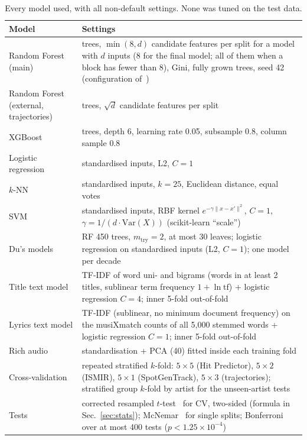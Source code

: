 \begin{table}[!htbp]
\centering
\caption{Every model used, with all non-default settings. None was tuned on the test data.}
\label{tab:settings}
\footnotesize
\setlength{\tabcolsep}{3pt}
\begin{tabular}{@{}>{\raggedright\arraybackslash}p{2.4cm}>{\raggedright\arraybackslash}p{5.6cm}@{}}
\toprule
Model & Settings \\
\midrule
Random Forest (main) & 80 trees, $\min(8,d)$ candidate features per split for a model with $d$ inputs (8 for the final model; all of them when a block has fewer than 8), Gini, fully grown trees, seed 42 (configuration of~\cite{middlebrook2019song}) \\
Random Forest (external, trajectories) & 200 trees, $\sqrt{d}$ candidate features per split \\
XGBoost & 400 trees, depth 6, learning rate 0.05, subsample 0.8, column sample 0.8 \\
Logistic regression & standardised inputs, L2, $C=1$ \\
$k$-NN & standardised inputs, $k=25$, Euclidean distance, equal votes \\
SVM & standardised inputs, RBF kernel $e^{-\gamma\|x-x'\|^2}$, $C=1$, $\gamma=1/(d\cdot\mathrm{Var}(X))$ (scikit-learn ``scale'') \\
Du's models~\cite{du2022spotify} & RF 450 trees, $m_{\text{try}}=2$, at most 30 leaves; logistic regression on standardised inputs (L2, $C=1$); one model per decade \\
Title text model & TF-IDF of word uni- and bigrams (words in at least 2 titles, sublinear term frequency $1+\ln\mathrm{tf}$) + logistic regression $C=4$; inner 5-fold out-of-fold \\
Lyrics text model & TF-IDF (sublinear, no minimum document frequency) on the musiXmatch counts of all 5{,}000 stemmed words + logistic regression $C=1$; inner 5-fold out-of-fold \\
Rich audio & standardisation + PCA (40) fitted inside each training fold \\
\midrule
Cross-validation & repeated stratified $k$-fold: $5{\times}5$ (Hit Predictor), $5{\times}2$ (ISMIR), $5{\times}1$ (SpotGenTrack), $5{\times}3$ (trajectories); stratified group $k$-fold by artist for the unseen-artist tests \\
Tests & corrected resampled $t$-test~\cite{nadeau2003inference} for CV, two-sided (formula in Sec.~\ref{sec:stats}); McNemar~\cite{dietterich1998approximate} for single splits; Bonferroni over at most 400 tests ($p<1.25\times10^{-4}$) \\

\end{tabular}
\end{table}
